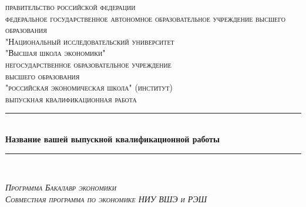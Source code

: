 \documentclass[12pt]{article}
\begin{document}
 \onehalfspacing
\begin{titlepage}

\newcommand{\HRule}{\rule{\linewidth}{0.5mm}} %

\center %

\textsc{правительство российской федерации}\\
\textsc{федеральное государственное автономное образовательное учреждение высшего образования}\\
\textsc{"Национальный исследовательский университет}\\
\textsc{"Высшая школа экономики"}\\[1cm] %

\textsc{негосударственное образовательное учреждение}\\
\textsc{высшего образования}\\
\textsc{"российская экономическая школа" (институт)}\\[2cm]

\textsc{\textmd{выпускная квалификационная работа}}\\[0.5cm]
\begin{spacing}{1.5}
\HRule \\[0.4cm]
{ \huge \bfseries Название вашей выпускной квалификационной работы}\\[0.4cm] %
\HRule \\[0.5cm]
\end{spacing}

\textsc{\textit{\large Программа Бакалавр экономики}}\\[0.2cm]
\textsc{\textit{\large Совместная программа по экономике НИУ ВШЭ и РЭШ}}\\[2cm]



\end{titlepage}
\end{document}
